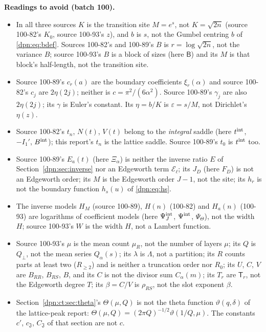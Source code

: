 \documentclass[11pt]{article}
\numberwithin{equation}{section}
\theoremstyle{definition}\newtheorem{definition}[theorem]{Definition}
\theoremstyle{remark}\newtheorem{remark}[theorem]{Remark}
\newcommand{\eps}{\varepsilon}
\begin{document}
\noindent\textbf{Readings to avoid (batch 100).}
\begin{itemize}
\item In all three sources $K$ is the transition site $M=e^s$, not
      $K=\sqrt{2n}$ (source 100-82's $K_0$, source 100-93's $z$), and $b$ is
      $s$, not the Gumbel centring $b$ of \eqref{dpn:eq:bdef}.  Sources 100-82's
      and 100-89's $B$ is $r=\log\sqrt{2n}$, not the variance $B$; source
      100-93's $B$ is a block of sizes (here $\mathsf B$) and its $M$ is that
      block's half-length, not the transition site.
\item Source 100-89's $c_r(a)$ are the boundary coefficients $\xi_r(\alpha)$
      and source 100-82's $c_j$ are $2\eta(2j)$; neither is $c=\pi^2/(6\alpha^2)$.
      Source 100-89's $\gamma_j$ are also $2\eta(2j)$; its $\gamma$ is Euler's
      constant.  Its $\eta=b/K$ is $\eps=s/M$, not Dirichlet's $\eta(z)$.
\item Source 100-82's $t_n$, $N(t)$, $V(t)$ belong to the \emph{integral}
      saddle (here $t^{\rm int}$, $-I_1'$, $B^{\rm int}$); this report's $t_n$ is
      the lattice saddle.  Source 100-89's $t_0$ is $t^{\rm int}$ too.
\item Source 100-89's $E_a(t)$ (here $\Xi_\alpha$) is neither the inverse ratio
      $E$ of Section~\ref{dpn:sec:inverse} nor an Edgeworth term
      $\mathcal E_\ell$; its $J_D$ (here $F_D$) is not an Edgeworth order; its
      $M$ is the Edgeworth order $J-1$, not the site; its $h_r$ is not the
      boundary function $h_s(u)$ of \eqref{dpn:eq:hs}.
\item The inverse models $H_M$ (source 100-89), $H(n)$ (100-82) and $H_a(n)$
      (100-93) are logarithms of coefficient models (here $\Psi^{\rm int}_J$,
      $\Psi^{\rm int}$, $\Psi_\Theta$), not the width $H$; source 100-93's $W$ is
      the width $H$, not a Lambert function.
\item Source 100-93's $\mu$ is the mean count $\mu_R$, not the number of
      layers $\mu$; its $Q$ is $Q_\perp$, not the mean series $Q_\alpha(s)$; its
      $\lambda$ is $\Lambda$, not a partition; its $R$ counts parts at least
      two ($R_{\ge2}$) and is neither a truncation order nor $R_0$; its $U$,
      $C$, $V$ are $B_{RR}$, $B_{RS}$, $B$, and its $C$ is not the divisor sum
      $C_\alpha(m)$; its $T_r$ are $\mathsf T_r$, not the Edgeworth degree $T$; its
      $\beta=C/V$ is $\rho_{RS}$, not the slot exponent $\beta$.
\item Section~\ref{dpn:ct:sec:theta}'s $\Theta(\mu,Q)$ is not the theta
      function $\vartheta(q,\delta)$ of the lattice-peak report:
      $\Theta(\mu,Q)=(2\pi Q)^{-1/2}\vartheta(1/Q,\mu)$.  The constants $c'$,
      $c_{\mathfrak J}$, $C_{\mathfrak J}$ of that section are not $c$.
\end{itemize}
\end{document}
